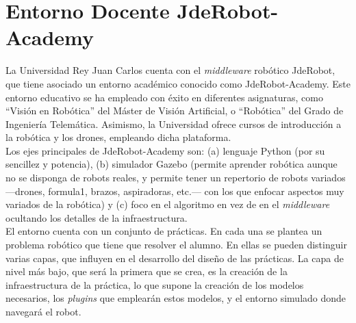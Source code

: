 \section{Entorno Docente JdeRobot-Academy}
La Universidad Rey Juan Carlos cuenta con el \textit{middleware} robótico JdeRobot, que tiene asociado un entorno académico conocido como JdeRobot-Academy. Este entorno educativo se ha empleado con éxito en diferentes asignaturas, como ``Visión en Robótica'' del Máster de Visión Artificial, o ``Robótica'' del Grado de Ingeniería Telemática. Asimismo, la Universidad ofrece cursos de introducción a la robótica y los drones, empleando dicha plataforma.\\

Los ejes principales de JdeRobot-Academy son: (a) lenguaje Python (por su sencillez y potencia), (b) simulador Gazebo (permite aprender robótica aunque no se disponga de robots reales, y permite tener un repertorio de robots variados ---drones, formula1, brazos, aspiradoras, etc.--- con los que enfocar aspectos muy variados de la robótica) y (c) foco en el algoritmo en vez de en el \textit{middleware} ocultando los detalles de la infraestructura.\\


El entorno cuenta con un conjunto de prácticas. En cada una se plantea un problema robótico que tiene que resolver el alumno. En ellas se pueden distinguir varias capas, que influyen en el desarrollo del diseño de las prácticas. La capa de nivel más bajo, que será la primera que se crea, es la creación de la infraestructura de la práctica, lo que supone la creación de los modelos necesarios, los \textit{plugins} que emplearán estos modelos, y el entorno simulado donde navegará el robot. \\

